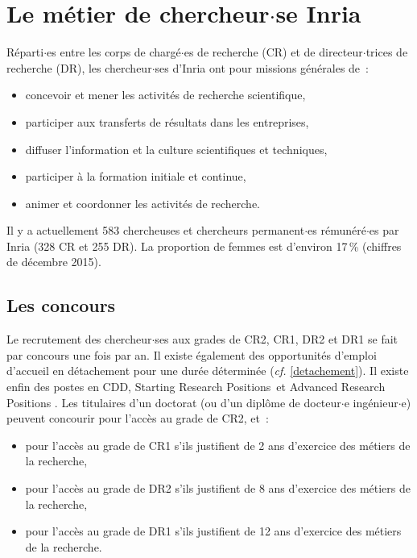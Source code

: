 \chapter{Le m\'etier de chercheur$\cdot$se Inria}
R\'eparti$\cdot$es entre les corps de charg\'e$\cdot$es de recherche (CR) et de
directeur$\cdot$trices de recherche (DR), les chercheur$\cdot$ses d'Inria ont pour
missions g\'en\'erales de~:
\begin{itemize}
\item concevoir et mener les activit\'es de recherche scientifique,
\item participer aux transferts de r\'esultats dans les entreprises,
\item diffuser l'information et la culture scientifiques et techniques,
\item participer \`a la formation initiale et continue,
\item animer et coordonner les activit\'es de recherche.
\end{itemize}
Il y a actuellement 583 chercheuses et chercheurs permanent$\cdot$es r\'emun\'er\'e$\cdot$es par Inria (328 CR et 255 DR). 
La proportion de femmes est d'environ 17\,\% (chiffres de d\'ecembre 2015).

\section{Les concours}
\label{concours Inria}
Le recrutement des chercheur$\cdot$ses aux grades de CR2, CR1, DR2 et DR1 se
fait par concours une fois par an. Il existe \'egalement des
opportunit\'es d'emploi d'accueil en d\'etachement pour une dur\'ee
d\'etermin\'ee ({\em cf.} \ref{detachement}). 
Il existe enfin des postes en CDD, \og Starting Research Positions\fg\ et 
\og Advanced Research Positions \fg. 
Les titulaires d'un doctorat (ou d'un dipl\^ome de docteur$\cdot$e ing\'enieur$\cdot$e) peuvent concourir 
pour l'acc\`es au grade de CR2, et~:
\begin{itemize}
\item pour l'acc\`es au grade de CR1 s'ils justifient de 2 ans
d'exercice des m\'etiers de la recherche,
\item pour l'acc\`es au grade de DR2 s'ils justifient de 8 ans
d'exercice des m\'etiers de la recherche,
\item pour l'acc\`es au grade de DR1 s'ils justifient de 12 ans
d'exercice des m\'etiers de la recherche.
\end{itemize}

